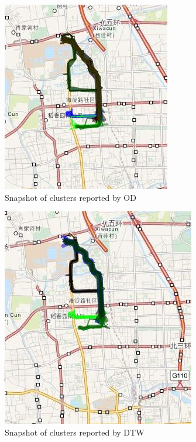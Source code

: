  
\begin{figure}
\centering     
\includegraphics[scale=0.4]{figs/snapshot_od.jpg}
\caption{Snapshot of clusters reported by OD}
\label{fig:casestudy_od}  
\end{figure} 

\begin{figure}
\centering     
\includegraphics[scale=0.4]{figs/snapshot_dtw.jpg}
\caption{Snapshot of clusters reported by DTW}
\label{fig:casestudy_dtw}  
\end{figure} 

